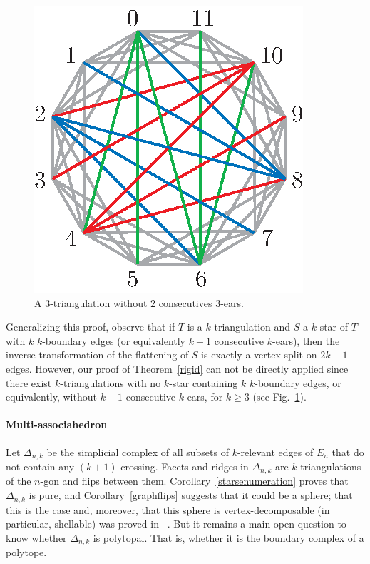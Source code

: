 \documentclass[12pt]{amsart}
\begin{document}
\begin{figure}
\centerline{\includegraphics[scale=1]{ctrexm3.eps}}
\caption{\small{A $3$-triangulation without $2$ consecutives $3$-ears.}}\label{ctrexm3}
\end{figure}

Generalizing this proof, observe that if $T$ is a $k$-triangulation and $S$ a $k$-star of $T$ with $k$ $k$-boundary edges (or equivalently $k-1$ consecutive $k$-ears), then the inverse transformation of the flattening of $S$ is exactly a vertex split on $2k-1$ edges. However, our proof of Theorem~\ref{rigid} can not be directly applied since there exist $k$-triangulations with no $k$-star containing $k$ $k$-boundary edges, or equivalently, without $k-1$ consecutive $k$-ears, for $k\ge 3$ (see Fig.~\ref{ctrexm3}).


\bigskip

\paragraph{{\sc Multi-associahedron}}

Let $\Delta_{n,k}$ be the simplicial complex of all subsets of $k$-relevant edges of $E_n$ that do not contain any $(k+1)$-crossing.
Facets and ridges in $\Delta_{n,k}$ are $k$-triangulations of the $n$-gon and flips between them. Corollary~\ref{starsenumeration} proves that $\Delta_{n,k}$ is pure, and Corollary~\ref{graphflips} suggests that it could be a sphere; that this is the case and, moreover, that this sphere is vertex-decomposable (in particular, shellable) was proved in ~\cite{j-gt-03,j-gtdfssp-05,dgjm-scclahp-08}. But it remains a main open question to know whether $\Delta_{n,k}$ is polytopal. That is, whether it is the boundary complex of a polytope.
\end{document}
